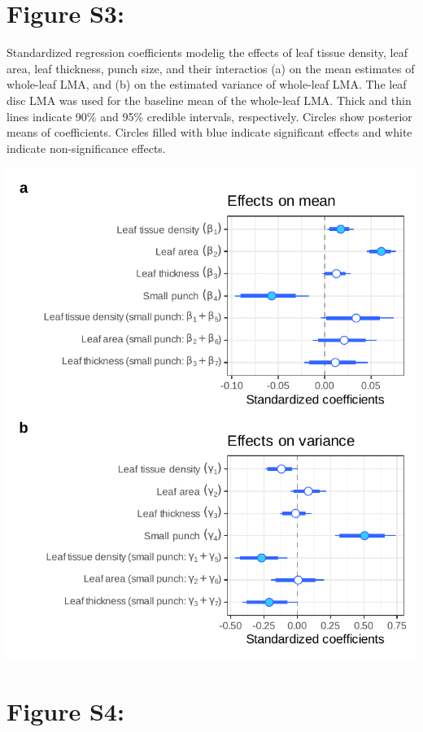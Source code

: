 \documentclass[
  12pt,
  a4paper,
,tablecaptionabove
]{scrartcl}
\begin{document}
\newpage

\hypertarget{figure-s3}{%
\section{Figure S3:}\label{figure-s3}}

Standardized regression coefficients modelig the effects of leaf tissue
density, leaf area, leaf thickness, punch size, and their interactios
(a) on the mean estimates of whole-leaf LMA, and (b) on the estimated
variance of whole-leaf LMA. The leaf disc LMA was used for the baseline
mean of the whole-leaf LMA. Thick and thin lines indicate 90\% and 95\%
credible intervals, respectively. Circles show posterior means of
coefficients. Circles filled with blue indicate significant effects and
white indicate non-significance effects.

\includegraphics{../figs/coef_sp_punch1_add.pdf}

\newpage

\hypertarget{figure-s4}{%
\section{Figure S4:}\label{figure-s4}}
\end{document}
